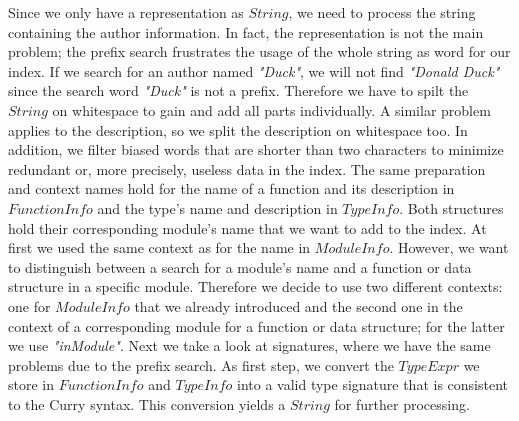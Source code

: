 \documentclass[%
	pdftex,%
	a4paper,%
	oneside,%
	chapterprefix,%
	headsepline,%
	12pt%
]{scrbook}
\newcommand{\textss}[1]{"#1"}
\newcommand{\Conid}[1]{\mathit{#1}}
\begin{document}
\begin{table}[h]
\caption{The contexts for a \ensuremath{\Conid{ModuleInfo}} data structure}
\label{t:modcontext}
\end{table}

Since we only have a representation as \ensuremath{\Conid{String}}, we need to process
the string containing the author information. %
In fact, the representation is not the main problem; the prefix search
frustrates the usage of the whole string as word for our index. %
If we search for an author named \emph{\textss{Duck}}, we will not
find \emph{\textss{Donald Duck}} since the search word
\emph{\textss{Duck}} is not a prefix. %
Therefore we have to spilt the \ensuremath{\Conid{String}} on whitespace to gain and add
all parts individually. %
A similar problem applies to the description, so we split the
description on whitespace too. %
In addition, we filter biased words that are shorter than two
characters to minimize redundant or, more precisely, useless data in
the index. %
The same preparation and context names hold for the name of a function
and its description in \ensuremath{\Conid{FunctionInfo}} and the type's name and
description in \ensuremath{\Conid{TypeInfo}}. %
Both structures hold their corresponding module's name that we want to
add to the index. %
At first we used the same context as for the name in \ensuremath{\Conid{ModuleInfo}}. %
However, we want to distinguish between a search for a module's name
and a function or data structure in a specific module. %
Therefore we decide to use two different contexts: one for
\ensuremath{\Conid{ModuleInfo}} that we already introduced and the second one in the
context of a corresponding module for a function or data structure;
for the latter we use \emph{\textss{inModule}}. %
Next we take a look at signatures, where we have the same problems due
to the prefix search. %
As first step, we convert the \ensuremath{\Conid{TypeExpr}} we store in \ensuremath{\Conid{FunctionInfo}}
and \ensuremath{\Conid{TypeInfo}} into a valid type signature that is consistent to the
Curry syntax. %
This conversion yields a \ensuremath{\Conid{String}} for further processing. %
\end{document}
